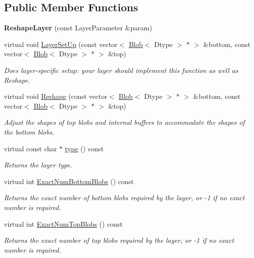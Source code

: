 \subsection*{Public Member Functions}
\begin{DoxyCompactItemize}
\item 
{\bfseries Reshape\+Layer} (const Layer\+Parameter \&param)\hypertarget{classcaffe_1_1ReshapeLayer_a395797dafb00e39da4f9c60f0554eece}{}\label{classcaffe_1_1ReshapeLayer_a395797dafb00e39da4f9c60f0554eece}

\item 
virtual void \hyperlink{classcaffe_1_1ReshapeLayer_a02faac38c813c7c35fc160e67601f2de}{Layer\+Set\+Up} (const vector$<$ \hyperlink{classcaffe_1_1Blob}{Blob}$<$ Dtype $>$ $\ast$ $>$ \&bottom, const vector$<$ \hyperlink{classcaffe_1_1Blob}{Blob}$<$ Dtype $>$ $\ast$ $>$ \&top)
\begin{DoxyCompactList}\small\item\em Does layer-\/specific setup\+: your layer should implement this function as well as Reshape. \end{DoxyCompactList}\item 
virtual void \hyperlink{classcaffe_1_1ReshapeLayer_af46f0e12298234807592c8d5715eca4d}{Reshape} (const vector$<$ \hyperlink{classcaffe_1_1Blob}{Blob}$<$ Dtype $>$ $\ast$ $>$ \&bottom, const vector$<$ \hyperlink{classcaffe_1_1Blob}{Blob}$<$ Dtype $>$ $\ast$ $>$ \&top)
\begin{DoxyCompactList}\small\item\em Adjust the shapes of top blobs and internal buffers to accommodate the shapes of the bottom blobs. \end{DoxyCompactList}\item 
virtual const char $\ast$ \hyperlink{classcaffe_1_1ReshapeLayer_a64e1b9bb9f642e80f603b011c467a0d2}{type} () const \hypertarget{classcaffe_1_1ReshapeLayer_a64e1b9bb9f642e80f603b011c467a0d2}{}\label{classcaffe_1_1ReshapeLayer_a64e1b9bb9f642e80f603b011c467a0d2}

\begin{DoxyCompactList}\small\item\em Returns the layer type. \end{DoxyCompactList}\item 
virtual int \hyperlink{classcaffe_1_1ReshapeLayer_adf4f419172a77dbef9535dcd9f69f8c6}{Exact\+Num\+Bottom\+Blobs} () const 
\begin{DoxyCompactList}\small\item\em Returns the exact number of bottom blobs required by the layer, or -\/1 if no exact number is required. \end{DoxyCompactList}\item 
virtual int \hyperlink{classcaffe_1_1ReshapeLayer_aa624eade2fa1947073070bfcfa08f374}{Exact\+Num\+Top\+Blobs} () const 
\begin{DoxyCompactList}\small\item\em Returns the exact number of top blobs required by the layer, or -\/1 if no exact number is required. \end{DoxyCompactList}\end{DoxyCompactItemize}
